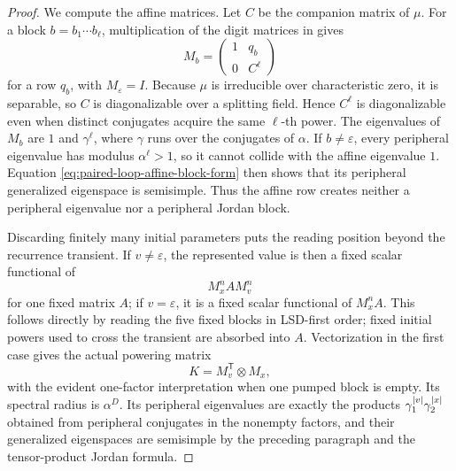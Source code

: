 \begin{proof}
  We compute the affine matrices. Let \(C\) be the companion matrix of
  \(\mu\). For a block \(b=b_1\cdots b_\ell\), multiplication of the digit
  matrices in  gives
  \begin{equation}
    M_b=
    \begin{pmatrix}1&q_b\\0&C^\ell\end{pmatrix}
    \label{eq:paired-loop-affine-block-form}
  \end{equation}
  for a row \(q_b\), with \(M_\varepsilon=I\). Because \(\mu\) is
  irreducible over characteristic zero, it is separable, so \(C\) is
  diagonalizable over a splitting field. Hence \(C^\ell\) is
  diagonalizable even when distinct conjugates acquire the same
  \(\ell\)-th power. The eigenvalues of \(M_b\) are \(1\) and
  \(\gamma^\ell\), where \(\gamma\) runs over the conjugates of \(\alpha\).
  If \(b\ne\varepsilon\), every peripheral eigenvalue has modulus
  \(\alpha^\ell>1\), so it cannot collide with the affine eigenvalue \(1\).
  Equation \eqref{eq:paired-loop-affine-block-form} then shows that its
  peripheral generalized eigenspace is semisimple. Thus the affine row
  creates neither a peripheral eigenvalue nor a peripheral Jordan block.

  Discarding finitely many initial parameters puts the reading position
  beyond the recurrence transient. If \(v\ne\varepsilon\), the represented
  value is then a fixed scalar functional of
  \[
    M_x^n A M_v^n
  \]
  for one fixed matrix \(A\); if \(v=\varepsilon\), it is a fixed scalar
  functional of \(M_x^n A\). This follows directly by reading the five
  fixed blocks in LSD-first order; fixed initial powers used to cross the
  transient are absorbed into \(A\). Vectorization in the first case gives
  the actual powering matrix
  \[
    K=M_v^{\mathsf T}\otimes M_x,
  \]
  with the evident one-factor interpretation when one pumped block is
  empty. Its spectral radius is \(\alpha^D\). Its peripheral eigenvalues
  are exactly the products
  \(
    \gamma_1^{\lvert v \rvert}\gamma_2^{\lvert x \rvert}
  \)
  obtained from peripheral conjugates in the nonempty factors, and their
  generalized eigenspaces are semisimple by the preceding paragraph and
  the tensor-product Jordan formula.


\end{proof}
